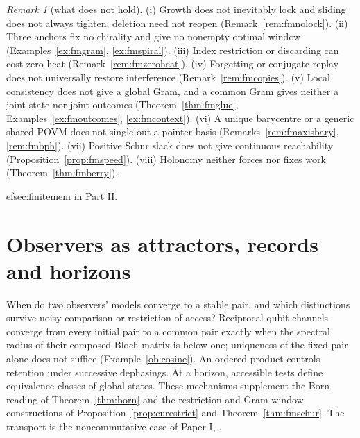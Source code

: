 \documentclass[aps,pra,onecolumn,superscriptaddress,nofootinbib,10pt]{revtex4-2}
\theoremstyle{definition}
\theoremstyle{remark}
\newtheorem{remark}[theorem]{Remark}
\begin{document}
\begin{remark}[what does not hold]\label{rem:fmnogo}
(i) Growth does not inevitably lock and sliding does not always tighten; deletion need not reopen
(Remark~\ref{rem:fmnolock}).  (ii) Three anchors fix no chirality and give no nonempty optimal window
(Examples~\ref{ex:fmgram}, \ref{ex:fmspiral}).  (iii) Index restriction or discarding can cost zero heat
(Remark~\ref{rem:fmzeroheat}).  (iv) Forgetting or conjugate replay does not universally restore interference
(Remark~\ref{rem:fmcopies}).  (v) Local consistency does not give a global Gram, and a common Gram gives neither a joint
state nor joint outcomes (Theorem~\ref{thm:fmglue}, Examples~\ref{ex:fmoutcomes}, \ref{ex:fmcontext}).  (vi) A unique barycentre
or a generic shared POVM does not single out a pointer basis (Remarks~\ref{rem:fmaxisbary}, \ref{rem:fmbph}).  (vii) Positive
Schur slack does not give continuous reachability (Proposition~\ref{prop:fmspeed}).  (viii) Holonomy neither forces
nor fixes work (Theorem~\ref{thm:fmberry}).
\end{remark}

ef{sec:finitemem} in Part II.

\section{Observers as attractors, records and horizons}\label{sec:observers}



When do two observers' models converge to a stable pair, and which
distinctions survive noisy comparison or restriction of access?
Reciprocal qubit channels converge from every initial pair to a common pair exactly when
the spectral radius of their composed Bloch matrix is below one; uniqueness of the fixed pair
alone does not suffice (Example~\ref{ob:cosine}).
An ordered product controls retention under successive dephasings.
At a horizon, accessible tests define equivalence classes of global states.
These mechanisms supplement the Born reading of Theorem~\ref{thm:born}
and the restriction and Gram-window constructions of
Proposition~\ref{prop:curestrict} and Theorem~\ref{thm:fmschur}.
The transport is the noncommutative case of Paper I,
\cite[Thm.~3.1]{PaperI}.
\end{document}

